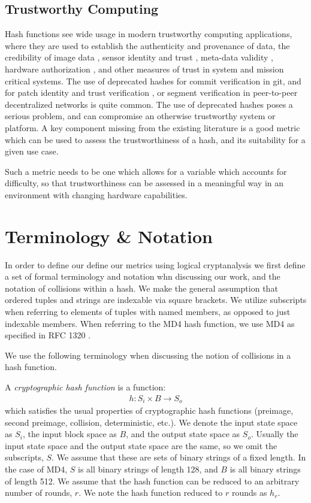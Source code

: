 \documentclass[conference]{IEEEtran}
\begin{document}
\subsection{Trustworthy Computing}

Hash functions see wide usage in modern trustworthy computing
applications, where they are used to establish the authenticity and
provenance of data, the credibility of image data
\cite{friedman1993trustworthy}, sensor identity and trust
\cite{wong2006dynamic}, meta-data validity \cite{bayer1993improving},
hardware authorization \cite{sirer2011logical}, and other measures of
trust in system and mission critical systems.
The use of deprecated hashes for commit verification in
git\cite{loeliger2012version}, and for patch identity and trust
verification \cite{kuhn2005secure}, or segment verification in
peer-to-peer decentralized networks \cite{lua2005survey} is quite
common.  The use of deprecated hashes poses a serious problem, and can
compromise an otherwise trustworthy system or platform.  A key
component missing from the existing literature is a good metric which
can be used to assess the trustworthiness of a hash, and its
suitability for a given use case.

Such a metric needs to be one which allows for a variable which
accounts for difficulty, so that trustworthiness can be assessed in a
meaningful way in an environment with changing hardware capabilities.

\section{Terminology \& Notation}  \label{Sec:Terminology}

In order to define our define our metrics using logical cryptanalysis
we first define a set of formal terminology and notation whn
discussing our work, and the notation of collisions within a hash.
We make the general assumption that ordered tuples and strings are
indexable via square brackets. We utilize subscripts when referring to
elements of tuples with named members, as opposed to just indexable
members.  When referring to the MD4 hash function, we use MD4 as
specified in RFC 1320 \cite{rfc1320}.

We use the following terminology when discussing the notion of collisions in
a hash function.

A \textit{cryptographic hash function} is a function:
\begin{align*}
  h: S_{i} \times B \rightarrow S_{o}
\end{align*}
which satisfies the usual properties of cryptographic hash functions
(preimage, second preimage, collision, deterministic, etc.). We denote
the input state space as $S_{i}$, the input block space as $B$, and the
output state space as $S_{o}$. Usually the input state space and the
output state space are the same, so we omit the subscripts, $S$. We
assume that these are sets of binary strings of a fixed length. In the
case of MD4, $S$ is all binary strings of length 128, and $B$ is all
binary strings of length 512. We assume that the hash function can be
reduced to an arbitrary number of rounds, $r$. We note the hash
function reduced to $r$ rounds as $h_{r}$.
\end{document}
